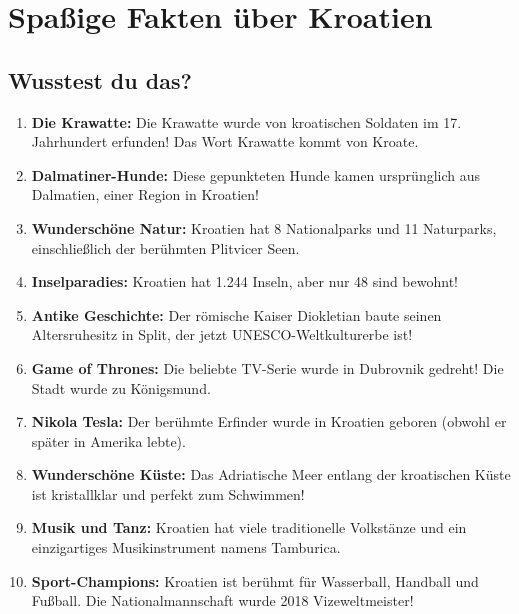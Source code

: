 \section{Spaßige Fakten über Kroatien}

\begin{culture}
\subsection*{Wusstest du das?}

\begin{enumerate}
    \item \textbf{Die Krawatte:} Die Krawatte wurde von kroatischen Soldaten im 17. Jahrhundert erfunden! Das Wort \glqq Krawatte\grqq{} kommt von \glqq Kroate.\grqq{}
    
    \item \textbf{Dalmatiner-Hunde:} Diese gepunkteten Hunde kamen ursprünglich aus Dalmatien, einer Region in Kroatien!
    
    \item \textbf{Wunderschöne Natur:} Kroatien hat 8 Nationalparks und 11 Naturparks, einschließlich der berühmten Plitvicer Seen.
    
    \item \textbf{Inselparadies:} Kroatien hat 1.244 Inseln, aber nur 48 sind bewohnt!
    
    \item \textbf{Antike Geschichte:} Der römische Kaiser Diokletian baute seinen Altersruhesitz in Split, der jetzt UNESCO-Weltkulturerbe ist!
    
    \item \textbf{Game of Thrones:} Die beliebte TV-Serie wurde in Dubrovnik gedreht! Die Stadt wurde zu \glqq Königsmund.\grqq{}
    
    \item \textbf{Nikola Tesla:} Der berühmte Erfinder wurde in Kroatien geboren (obwohl er später in Amerika lebte).
    
    \item \textbf{Wunderschöne Küste:} Das Adriatische Meer entlang der kroatischen Küste ist kristallklar und perfekt zum Schwimmen!
    
    \item \textbf{Musik und Tanz:} Kroatien hat viele traditionelle Volkstänze und ein einzigartiges Musikinstrument namens Tamburica.
    
    \item \textbf{Sport-Champions:} Kroatien ist berühmt für Wasserball, Handball und Fußball. Die Nationalmannschaft wurde 2018 Vizeweltmeister!
\end{enumerate}


\end{culture}

